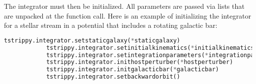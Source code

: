 \documentclass{article}
\begin{document}
        The integrator must then be initialized. All parameters are passed via lists that are unpacked at the function call. Here is an example of initializing the integrator for a stellar stream in a potential that includes a rotating galactic bar:
        \small
        \begin{lstlisting}[language=python]
            tstrippy.integrator.setstaticgalaxy(*staticgalaxy)
            tstrippy.integrator.setinitialkinematics(*initialkinematics)
            tstrippy.integrator.setintegrationparameters(*integrationparameters)
            tstrippy.integrator.inithostperturber(*hostperturber)
            tstrippy.integrator.initgalacticbar(*galacticbar)
            tstrippy.integrator.setbackwardorbit()
        \end{lstlisting}
        \normalsize
\end{document}
